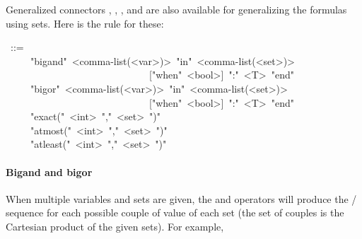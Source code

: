 \noindent Generalized connectors , , ,  and
 are also available for generalizing the formulas using sets. Here
is the rule for these:%
\begin{mdpre}%
~::=\\
~~~~\textbar{}~"bigand"~{\textless{}comma-list(\textless{}var\textgreater{})\textgreater{}}~"in"~{\textless{}comma-list(\textless{}set\textgreater{})\textgreater{}}\\
~~~~~~~~~~~~~~~~~~~~~~~~~~~~~{}["when"~{\textless{}bool\textgreater{}}]~":"~{\textless{}T\textgreater{}}~"end"\\
~~~~\textbar{}~"bigor"~{\textless{}comma-list(\textless{}var\textgreater{})\textgreater{}}~"in"~{\textless{}comma-list(\textless{}set\textgreater{})\textgreater{}}\\
~~~~~~~~~~~~~~~~~~~~~~~~~~~~~{}["when"~{\textless{}bool\textgreater{}}]~":"~{\textless{}T\textgreater{}}~"end"\\
~~~~\textbar{}~"exact("~{\textless{}int\textgreater{}}~","~{\textless{}set\textgreater{}}~")"\\
~~~~\textbar{}~"atmost("~{\textless{}int\textgreater{}}~","~{\textless{}set\textgreater{}}~")"\\
~~~~\textbar{}~"atleast("~{\textless{}int\textgreater{}}~","~{\textless{}set\textgreater{}}~")"%
\end{mdpre}
\paragraph{Bigand and bigor}\label{sec-bigand-and-bigor}%

\noindent When multiple variables and sets are given, the  and 
operators will produce the / sequence for each possible couple of
value of each set (the set of couples is the Cartesian product of the given
sets). For example,%

